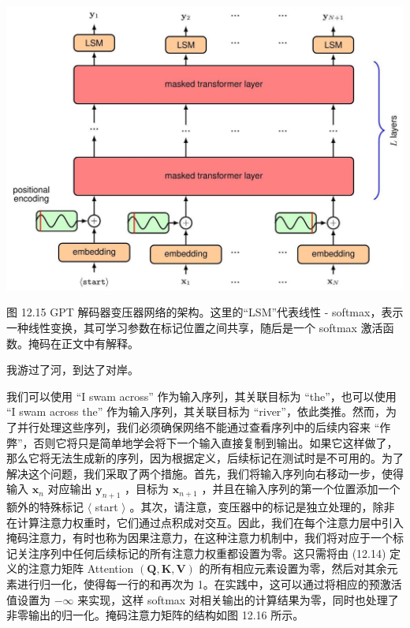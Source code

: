 \documentclass[10pt]{article}
\begin{document}
\begin{center}
\includegraphics[max width=1.0\textwidth]{images/0194e279-9b28-703a-88f4-c3ac21e2010d_403_297_353_1240_886_0.jpg}
\end{center}
\hspace*{3em} 

图 12.15 GPT 解码器变压器网络的架构。这里的“LSM”代表线性 - softmax，表示一种线性变换，其可学习参数在标记位置之间共享，随后是一个 softmax 激活函数。掩码在正文中有解释。

我游过了河，到达了对岸。

我们可以使用 “I swam across” 作为输入序列，其关联目标为 “the”，也可以使用 “I swam across the” 作为输入序列，其关联目标为 “river”，依此类推。然而，为了并行处理这些序列，我们必须确保网络不能通过查看序列中的后续内容来 “作弊”，否则它将只是简单地学会将下一个输入直接复制到输出。如果它这样做了，那么它将无法生成新的序列，因为根据定义，后续标记在测试时是不可用的。为了解决这个问题，我们采取了两个措施。首先，我们将输入序列向右移动一步，使得输入 \({\mathbf{x}}_{n}\) 对应输出 \({\mathbf{y}}_{n + 1}\) ，目标为 \({\mathbf{x}}_{n + 1}\) ，并且在输入序列的第一个位置添加一个额外的特殊标记 \(\langle\) start \(\rangle\) 。其次，请注意，变压器中的标记是独立处理的，除非在计算注意力权重时，它们通过点积成对交互。因此，我们在每个注意力层中引入掩码注意力，有时也称为因果注意力，在这种注意力机制中，我们将对应于一个标记关注序列中任何后续标记的所有注意力权重都设置为零。这只需将由 (12.14) 定义的注意力矩阵 Attention \(\left( {\mathbf{Q},\mathbf{K},\mathbf{V}}\right)\) 的所有相应元素设置为零，然后对其余元素进行归一化，使得每一行的和再次为 1。在实践中，这可以通过将相应的预激活值设置为 \(- \infty\) 来实现，这样 softmax 对相关输出的计算结果为零，同时也处理了非零输出的归一化。掩码注意力矩阵的结构如图 12.16 所示。
\end{document}

